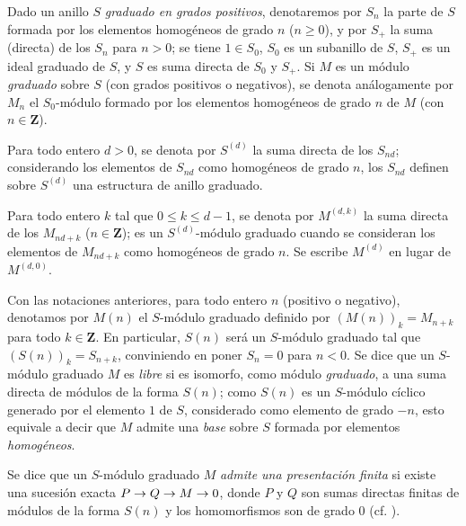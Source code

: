 \documentclass[oneside,10pt]{amsart}
\makeatletter
\renewcommand{\leq}{\leqslant}
\renewcommand{\geq}{\geqslant}
\newcommand{\ega@arrow}[2]{\mathchoice{#1}{#2}{#2}{#2}}
\renewcommand{\to}{\ega@arrow{\longrightarrow}{\rightarrow}}
\newcommand{\oldpage}[2][]{\marginnote{\normalfont\footnotesize\textbf{#1}~|~#2}\ignorespaces}
\let\EGAOriginalLabel\label
\renewcommand{\label}[1]{\phantomsection\EGAOriginalLabel{#1}}
\makeatother
\begin{document}
\begin{notation}[2.1.1]
\label{II.2.1.1-fr}
Dado un anillo $S$ \emph{graduado en grados positivos}, denotaremos por $S_n$ la parte de $S$ formada por los elementos homogéneos de grado $n$ ($n\geq0$), y por $S_+$ la suma (directa) de los $S_n$ para $n>0$; se tiene $1\in S_0$, $S_0$ es un subanillo de $S$, $S_+$ es un ideal graduado de $S$, y $S$ es suma directa de $S_0$ y $S_+$.
Si $M$ es un módulo \emph{graduado} sobre $S$ (con grados positivos o negativos), se denota análogamente por $M_n$ el $S_0$-módulo formado por los elementos homogéneos de grado $n$ de $M$ (con $n\in\mathbf{Z}$).

Para todo entero $d>0$, se denota por $S^{(d)}$ la suma directa de los $S_{nd}$; considerando los elementos de $S_{nd}$ como homogéneos de grado $n$, los $S_{nd}$ definen sobre $S^{(d)}$ una estructura de anillo graduado.

Para todo entero $k$ tal que $0\leq k\leq d-1$, se denota por $M^{(d,k)}$ la suma directa
\oldpage[II]{20}
de los $M_{nd+k}$ ($n\in\mathbf{Z}$); es un $S^{(d)}$-módulo graduado cuando se consideran los elementos de $M_{nd+k}$ como homogéneos de grado $n$.
Se escribe $M^{(d)}$ en lugar de $M^{(d,0)}$.

Con las notaciones anteriores, para todo entero $n$ (positivo o negativo), denotamos por $M(n)$ el $S$-módulo graduado definido por $(M(n))_k=M_{n+k}$ para todo $k\in\mathbf{Z}$.
En particular, $S(n)$ será un $S$-módulo graduado tal que $(S(n))_k=S_{n+k}$, conviniendo en poner $S_n=0$ para $n<0$.
Se dice que un $S$-módulo graduado $M$ es \emph{libre} si es isomorfo, como módulo \emph{graduado}, a una suma directa de módulos de la forma $S(n)$; como $S(n)$ es un $S$-módulo cíclico generado por el elemento $1$ de $S$, considerado como elemento de grado $-n$, esto equivale a decir que $M$ admite una \emph{base} sobre $S$ formada por elementos \emph{homogéneos}.

Se dice que un $S$-módulo graduado $M$ \emph{admite una presentación finita} si existe una sucesión exacta $P\to Q\to M\to0$, donde $P$ y $Q$ son sumas directas finitas de módulos de la forma $S(n)$ y los homomorfismos son de grado $0$ (cf. ).
\end{notation}
\end{document}
